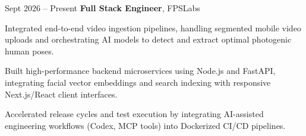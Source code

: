 \begin{twocolentry}{
            Sept 2026 – Present
        }
\textbf{Full Stack Engineer}, FPSLabs\end{twocolentry}

\vspace{0.10 cm}
\begin{onecolentry}
    \begin{highlights}
        \item Integrated end-to-end video ingestion pipelines, handling segmented mobile video uploads and orchestrating AI models to detect and extract optimal photogenic human poses.
        \item Built high-performance backend microservices using Node.js and FastAPI, integrating facial vector embeddings and search indexing with responsive Next.js/React client interfaces.
        \item Accelerated release cycles and test execution by integrating AI-assisted engineering workflows (Codex, MCP tools) into Dockerized CI/CD pipelines.
    \end{highlights}
\end{onecolentry}
